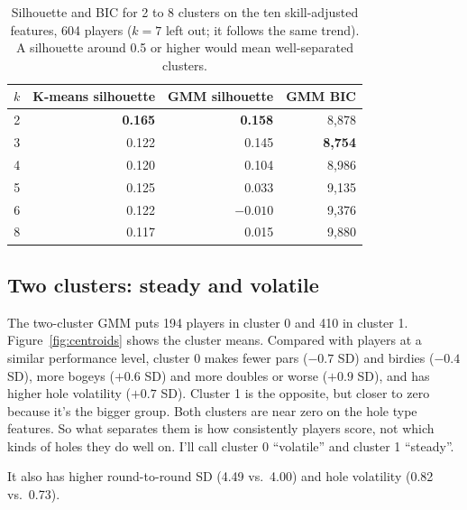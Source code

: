 \begin{table}[H]
\centering
\footnotesize
\setlength{\tabcolsep}{8pt}
\renewcommand{\arraystretch}{0.92}
\caption{Silhouette and BIC for 2 to 8 clusters on the ten skill-adjusted features, 604 players ($k = 7$ left out; it follows the same trend). A silhouette around 0.5 or higher would mean well-separated clusters.}
\label{tab:sweep}
\begin{tabular}{@{}rrrr@{}}
\toprule
\textbf{$k$} & \textbf{K-means silhouette} & \textbf{GMM silhouette} & \textbf{GMM BIC} \\
\midrule
2 & \textbf{0.165} & \textbf{0.158} & 8,878 \\
3 & 0.122 & 0.145 & \textbf{8,754} \\
4 & 0.120 & 0.104 & 8,986 \\
5 & 0.125 & 0.033 & 9,135 \\
6 & 0.122 & $-0.010$ & 9,376 \\
8 & 0.117 & 0.015 & 9,880 \\
\bottomrule
\end{tabular}
\end{table}

\subsection{Two clusters: steady and volatile}

The two-cluster GMM puts 194 players in cluster 0 and 410 in cluster 1. Figure~\ref{fig:centroids} shows the cluster means. Compared with players at a similar performance level, cluster 0 makes fewer pars ($-0.7$ SD) and birdies ($-0.4$ SD), more bogeys ($+0.6$ SD) and more doubles or worse ($+0.9$ SD), and has higher hole volatility ($+0.7$ SD). Cluster 1 is the opposite, but closer to zero because it's the bigger group. Both clusters are near zero on the hole type features. So what separates them is how consistently players score, not which kinds of holes they do well on. I'll call cluster 0 ``volatile'' and cluster 1 ``steady''.

It also has higher round-to-round SD (4.49 vs.\ 4.00) and hole volatility (0.82 vs.\ 0.73).

